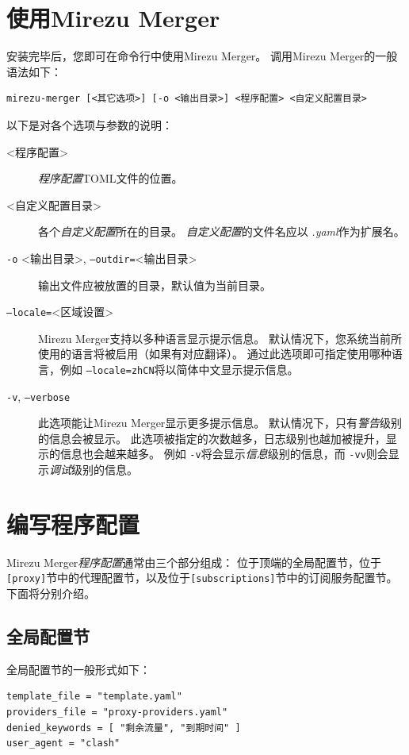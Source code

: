 \documentclass[a4paper,fontset=founder,punct=kaiming]{ctexart}
\renewcommand\_{\textunderscore\linebreak[1]}
\newcommand{\productname}{Mirezu Merger}
\begin{document}
\section{使用\productname}
\label{sec:usage}

安装完毕后，您即可在命令行中使用\productname 。
调用\productname 的一般语法如下：
\begin{Verbatim}
mirezu-merger [<其它选项>] [-o <输出目录>] <程序配置> <自定义配置目录>
\end{Verbatim}

以下是对各个选项与参数的说明：
\begin{description}
\item[\textless 程序配置\textgreater]
  \emph{程序配置}TOML文件的位置。
\item[\textless 自定义配置目录\textgreater]
  各个\emph{自定义配置}所在的目录。
  \emph{自定义配置}的文件名应以 \emph{.yaml}作为扩展名。
\item[\texttt{-o} \textless 输出目录\textgreater , \texttt{--outdir=}\textless 输出目录\textgreater]
  输出文件应被放置的目录，默认值为当前目录。
\item[\texttt{--locale=}\textless 区域设置\textgreater]
  \productname 支持以多种语言显示提示信息。
  默认情况下，您系统当前所使用的语言将被启用（如果有对应翻译）。
  通过此选项即可指定使用哪种语言，例如 \texttt{--locale=zh\_CN}将以简体中文显示提示信息。
\item[\texttt{-v}, \texttt{--verbose}]
  此选项能让\productname 显示更多提示信息。
  默认情况下，只有\emph{警告}级别的信息会被显示。
  此选项被指定的次数越多，日志级别也越加被提升，显示的信息也会越来越多。
  例如 \texttt{-v}将会显示\emph{信息}级别的信息，而 \texttt{-vv}则会显示\emph{调试}级别的信息。
\end{description}

\section{编写程序配置}
\label{sec:progconf}

\productname\emph{程序配置}通常由三个部分组成：
位于顶端的全局配置节，位于\texttt{[proxy]}节中的代理配置节，以及位于\texttt{[subscriptions]}节中的订阅服务配置节。
下面将分别介绍。

\subsection{全局配置节}
\label{sec:globalconf}

全局配置节的一般形式如下：
\begin{Verbatim}
template_file = "template.yaml"
providers_file = "proxy-providers.yaml"
denied_keywords = [ "剩余流量", "到期时间" ]
user_agent = "clash"
\end{Verbatim}
\end{document}
